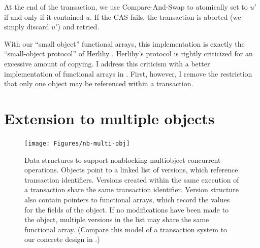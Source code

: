 At the end of the transaction, we use Compare-And-Swap to atomically
set  to $u'$ if and only if it contained $u$.  If the CAS fails,
the transaction is aborted (we simply discard $u'$) and retried.

With our \naive ``small object'' functional arrays, this implementation is
exactly the ``small-object protocol'' of Herlihy \cite{Herlihy93}.
Herlihy's protocol is rightly criticized for an excessive amount of
copying.  I address this criticism with a better implementation of
functional arrays in .  First, however, I remove
the restriction that only one object
may be referenced within a transaction.

\section{Extension to multiple objects}
\begin{figure}\centering
\texttt{[image: Figures/nb-multi-obj]}
\caption[Data structures to support nonblocking multiobject
  concurrent operations.]{Data structures to support nonblocking multiobject
  concurrent operations.  Objects point to a linked list of versions,
  which reference transaction identifiers.  Versions created within the
  same execution of a transaction share the same transaction
  identifier.  Version structure also contain pointers to functional
  arrays, which record the values for the fields of the object.
  If no modifications have been made to the object, multiple versions
  in the list may share the same functional array.  (Compare this model
  of a transaction system to our concrete design in .)}
\label{fig:multi-o}
\end{figure}
